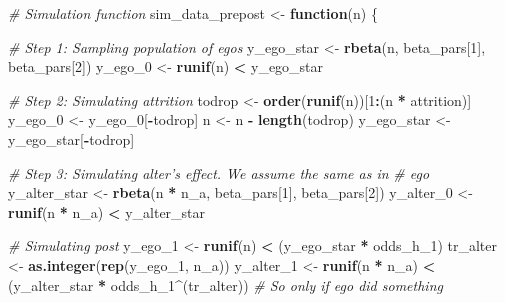 \documentclass[]{book}
\newenvironment{Shaded}{\begin{snugshade}}{\end{snugshade}}
\newcommand{\CommentTok}[1]{\textcolor[rgb]{0.56,0.35,0.01}{\textit{#1}}}
\newcommand{\ControlFlowTok}[1]{\textcolor[rgb]{0.13,0.29,0.53}{\textbf{#1}}}
\newcommand{\DecValTok}[1]{\textcolor[rgb]{0.00,0.00,0.81}{#1}}
\newcommand{\KeywordTok}[1]{\textcolor[rgb]{0.13,0.29,0.53}{\textbf{#1}}}
\newcommand{\NormalTok}[1]{#1}
\newcommand{\OperatorTok}[1]{\textcolor[rgb]{0.81,0.36,0.00}{\textbf{#1}}}
\newcommand{\StringTok}[1]{\textcolor[rgb]{0.31,0.60,0.02}{#1}}
\begin{document}
\begin{Shaded}
\begin{Highlighting}[]
\CommentTok{# Simulation function}
\NormalTok{sim_data_prepost <-}\StringTok{ }\ControlFlowTok{function}\NormalTok{(n) \{}


  \CommentTok{# Step 1: Sampling population of egos}
\NormalTok{  y_ego_star <-}\StringTok{ }\KeywordTok{rbeta}\NormalTok{(n, beta_pars[}\DecValTok{1}\NormalTok{], beta_pars[}\DecValTok{2}\NormalTok{])}
\NormalTok{  y_ego_}\DecValTok{0}\NormalTok{    <-}\StringTok{ }\KeywordTok{runif}\NormalTok{(n) }\OperatorTok{<}\StringTok{ }\NormalTok{y_ego_star}

  \CommentTok{# Step 2: Simulating attrition}
\NormalTok{  todrop     <-}\StringTok{ }\KeywordTok{order}\NormalTok{(}\KeywordTok{runif}\NormalTok{(n))[}\DecValTok{1}\OperatorTok{:}\NormalTok{(n }\OperatorTok{*}\StringTok{ }\NormalTok{attrition)]}
\NormalTok{  y_ego_}\DecValTok{0}\NormalTok{    <-}\StringTok{ }\NormalTok{y_ego_}\DecValTok{0}\NormalTok{[}\OperatorTok{-}\NormalTok{todrop]}
\NormalTok{  n          <-}\StringTok{ }\NormalTok{n }\OperatorTok{-}\StringTok{ }\KeywordTok{length}\NormalTok{(todrop)}
\NormalTok{  y_ego_star <-}\StringTok{ }\NormalTok{y_ego_star[}\OperatorTok{-}\NormalTok{todrop]}

  \CommentTok{# Step 3: Simulating alter's effect. We assume the same as in}
  \CommentTok{# ego}
\NormalTok{  y_alter_star <-}\StringTok{ }\KeywordTok{rbeta}\NormalTok{(n }\OperatorTok{*}\StringTok{ }\NormalTok{n_a, beta_pars[}\DecValTok{1}\NormalTok{], beta_pars[}\DecValTok{2}\NormalTok{])}
\NormalTok{  y_alter_}\DecValTok{0}\NormalTok{    <-}\StringTok{ }\KeywordTok{runif}\NormalTok{(n }\OperatorTok{*}\StringTok{ }\NormalTok{n_a) }\OperatorTok{<}\StringTok{ }\NormalTok{y_alter_star}

  \CommentTok{# Simulating post}
\NormalTok{  y_ego_}\DecValTok{1}\NormalTok{   <-}\StringTok{ }\KeywordTok{runif}\NormalTok{(n) }\OperatorTok{<}\StringTok{ }\NormalTok{(y_ego_star }\OperatorTok{*}\StringTok{ }\NormalTok{odds_h_}\DecValTok{1}\NormalTok{)}
\NormalTok{  tr_alter  <-}\StringTok{ }\KeywordTok{as.integer}\NormalTok{(}\KeywordTok{rep}\NormalTok{(y_ego_}\DecValTok{1}\NormalTok{, n_a))}
\NormalTok{  y_alter_}\DecValTok{1}\NormalTok{ <-}\StringTok{ }\KeywordTok{runif}\NormalTok{(n }\OperatorTok{*}\StringTok{ }\NormalTok{n_a) }\OperatorTok{<}\StringTok{ }\NormalTok{(y_alter_star }\OperatorTok{*}\StringTok{ }\NormalTok{odds_h_}\DecValTok{1}\OperatorTok{^}\NormalTok{(tr_alter)) }\CommentTok{# So only if ego did something}


\end{Highlighting}
\end{Shaded}
\end{document}
